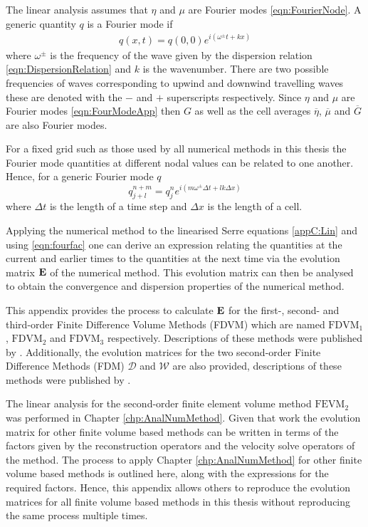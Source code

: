 The linear analysis assumes that $\eta$ and $\mu$ are Fourier modes \eqref{eqn:FourierNode}. A generic quantity $q$ is a Fourier mode if
\begin{align}
q(x,t) = q(0,0) e^{i\left(\omega^\pm t + kx\right)}
\label{eqn:FourModeApp}
\end{align}
where $\omega^\pm$ is the frequency of the wave given by the dispersion relation \eqref{eqn:DispersionRelation} and $k$ is the wavenumber. There are two possible frequencies of waves corresponding to upwind and downwind travelling waves these are denoted with the $-$ and $+$ superscripts respectively. Since $\eta$ and $\mu$ are Fourier modes \eqref{eqn:FourModeApp} then $G$ as well as the cell averages $\overline{\eta}$, $\overline{\mu}$ and $\overline{G}$ are also Fourier modes.

For a fixed grid such as those used by all numerical methods in this thesis the Fourier mode quantities at different nodal values can be related to one another. Hence, for a generic Fourier mode $q$ 
\begin{equation}
q^{n + m}_{j + l} = q^n_j e^{ i \left(m \omega^\pm \Delta t + l k \Delta x\right)}
\label{eqn:fourfac}
\end{equation}
where $\Delta t$ is the length of a time step and $\Delta x$ is the length of a cell. 


Applying the numerical method to the linearised Serre equations \eqref{appC:Lin} and using \eqref{eqn:fourfac} one can derive an expression relating the quantities at the current and earlier times to the quantities at the next time via the evolution matrix $\mathbf{E}$ of the numerical method. This evolution matrix can then be analysed to obtain the convergence and dispersion properties of the numerical method. 

This appendix provides the process to calculate $\mathbf{E}$ for the first-, second- and third-order Finite Difference Volume Methods (FDVM) which are named $\text{FDVM}_1$, $\text{FDVM}_2$ and $\text{FDVM}_3$ respectively. Descriptions of these methods were published by \citet{Zoppou-etal-2017}. Additionally, the evolution matrices for the two second-order Finite Difference Methods (FDM) $\mathcal{D}$ and $\mathcal{W}$ are also provided, descriptions of these methods were published by \citet{Pitt-2018-61}. 

The linear analysis for the second-order finite element volume method $\text{FEVM}_2$ was performed in Chapter \ref{chp:AnalNumMethod}. Given that work the evolution matrix for other finite volume based methods can be written in terms of the factors given by the reconstruction operators and the velocity solve operators of the method. The process to apply Chapter \ref{chp:AnalNumMethod} for other finite volume based methods is outlined here, along with the expressions for the required factors. Hence, this appendix allows others to reproduce the evolution matrices for all finite volume based methods in this thesis without reproducing the same process multiple times. 

